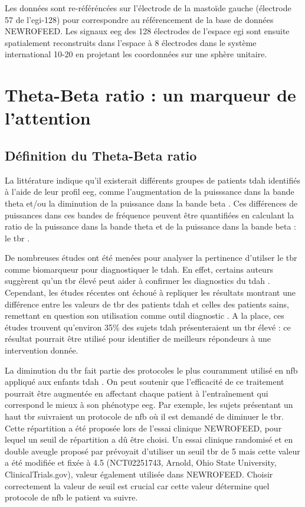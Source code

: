 Les données sont re-référéncées sur l'électrode de la mastoïde gauche (électrode 57 de l'\gls{egi}-128) pour correspondre au référencement de la base
de données NEWROFEED. Les signaux \gls{eeg} des 128 électrodes de l'espace \gls{egi} sont ensuite spatialement reconstruits dans l'espace à 8 électrodes 
dans le système international 10-20 en projetant les coordonnées sur une sphère unitaire.


\section{Theta-Beta ratio : un marqueur de l'attention}

\subsection{Définition du Theta-Beta ratio}
La littérature indique qu'il existerait différents groupes de patients \gls{tdah} identifiés à l'aide de leur profil \gls{eeg}, comme l'augmentation
de la puisssance dans la bande theta et/ou la diminution de la puissance dans la bande beta \citep{Clarke2011, Loo2018}. Ces différences de puissances dans ces 
bandes de fréquence peuvent être quantifiées en calculant la ratio de la puissance dans la bande theta et de la puissance dans la bande beta : le 
\gls{tbr} \citep{Arns2013}. 

De nombreuses études ont été menées pour analyser la pertinence d'utilser le \gls{tbr} comme biomarqueur pour diagnostiquer le \gls{tdah}. En effet, certains auteurs suggèrent qu'un \gls{tbr}
élevé peut aider à confirmer les diagnostics du \gls{tdah} \citep{NebaHealth, Saad2018, FDA}. Cependant, les études récentes ont échoué à repliquer les résultats
montrant une différence entre les valeurs de \gls{tbr} des patients \gls{tdah} et celles des patients sains, remettant en question son utilisation comme outil 
diagnostic \citep{Zhang2017, Arns2013, Clarke2001}. A la place, ces études trouvent qu'environ 35\% des sujets \gls{tdah} présenteraient un \gls{tbr} élevé : ce
résultat pourrait être utilisé pour identifier de meilleurs répondeurs à une intervention donnée. 

La diminution du \gls{tbr} fait partie des protocoles le plus couramment utilisé en \gls{nfb} appliqué aux enfants \gls{tdah} \citep{Arns2014}. 
On peut soutenir que l'efficacité de ce traitement pourrait être augmentée en affectant chaque patient à l'entraînement qui correspond le mieux à son phénotype \gls{eeg}. 
Par exemple, les sujets présentant un haut \gls{tbr} suivraient un protocole de \gls{nfb} où il est demandé de diminuer le \gls{tbr}. Cette répartition a été proposée lors 
de l'essai clinique NEWROFEED, pour lequel un seuil de répartition a dû être choisi. Un essai clinique randomisé et en double aveugle proposé par \citet{Kerson2013} 
prévoyait d'utiliser un seuil \gls{tbr} de 5 mais cette valeur a été modifiée et fixée à 4.5 (NCT02251743, Arnold, Ohio State University, ClinicalTrials.gov), valeur également
utilisée dans NEWROFEED. Choisir correctement la valeur de seuil est crucial car cette valeur détermine quel protocole de \gls{nfb} le patient va suivre. 

